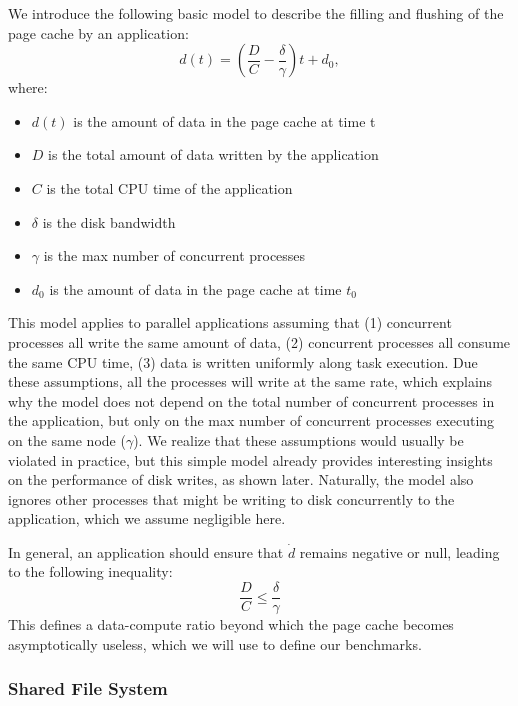 \documentclass{IEEEtran}
\begin{document}
We introduce the following basic model to describe the filling and 
flushing of the page cache by an application:
$$
d(t) = \left( \frac{D}{C} - \frac{\delta}{\gamma} \right)t + d_0,
$$
where:
\begin{itemize}
\item $d(t)$ is the amount of data in the page cache at time t
\item $D$ is the total amount of data written by the application
\item $C$ is the total CPU time of the application
\item $\delta$ is the disk bandwidth
\item $\gamma$ is the max number of concurrent processes
\item $d_0$ is the amount of data in the page cache at time $t_0$
\end{itemize}

This model applies to parallel applications assuming that (1) 
concurrent processes all write the same amount of data, (2) 
concurrent processes all consume the same CPU time, (3) data is written 
uniformly along task execution. Due these assumptions, all the 
processes will write at the same rate, which explains why the model 
does not depend on the total number of concurrent processes in the 
application, but only on the max number of concurrent processes 
executing on the same node ($\gamma$). We realize that these 
assumptions would usually be violated in practice, but this simple 
model already provides interesting insights on the performance of disk 
writes, as shown later. Naturally, the model also ignores other 
processes that might be writing to disk concurrently to the 
application, which we assume negligible here. 

In general, an application should ensure that $\dot d$ remains negative 
or null, leading to the following inequality:
\begin{equation}
\frac{D}{C} \leq \frac{\delta}{\gamma} \label{eq:page-cache-inequality}
\end{equation}
This defines a data-compute ratio beyond which the page cache becomes 
asymptotically useless, which we will use to define our benchmarks.


\subsubsection{Shared File System}

\end{document}
